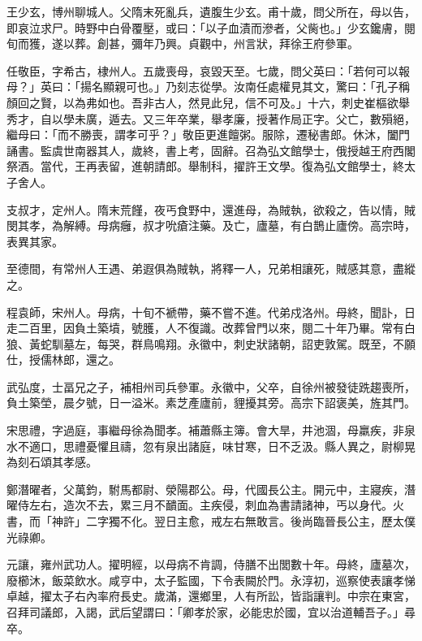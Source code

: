 \begin{pinyinscope}
 王少玄，博州聊城人。父隋末死亂兵，遺腹生少玄。甫十歲，問父所在，母以告，即哀泣求尸。時野中白骨覆壓，或曰：「以子血漬而滲者，父胔也。」少玄鑱膚，閱旬而獲，遂以葬。創甚，彌年乃興。貞觀中，州言狀，拜徐王府參軍。



 任敬臣，字希古，棣州人。五歲喪母，哀毀天至。七歲，問父英曰：「若何可以報母？」英曰：「揚名顯親可也。」乃刻志從學。汝南任處權見其文，驚曰：「孔子稱顏回之賢，以為弗如也。吾非古人，然見此兒，信不可及。」十六，刺史崔樞欲舉秀才，自以學未廣，遁去。又三年卒業，舉孝廉，授著作局正字。父亡，數殞絕，繼母曰：「而不勝喪，謂孝可乎？」敬臣更進饘粥。服除，遷秘書郎。休沐，闔門誦書。監虞世南器其人，歲終，書上考，固辭。召為弘文館學士，俄授越王府西閣祭酒。當代，王再表留，進朝請郎。舉制科，擢許王文學。復為弘文館學士，終太子舍人。



 支叔才，定州人。隋末荒饉，夜丐食野中，還進母，為賊執，欲殺之，告以情，賊閔其孝，為解縛。母病癰，叔才吮瘡注藥。及亡，廬墓，有白鵲止廬傍。高宗時，表異其家。



 至德間，有常州人王遇、弟遐俱為賊執，將釋一人，兄弟相讓死，賊感其意，盡縱之。



 程袁師，宋州人。母病，十旬不褫帶，藥不嘗不進。代弟戍洛州。母終，聞訃，日走二百里，因負土築墳，號臒，人不復識。改葬曾門以來，閱二十年乃畢。常有白狼、黃蛇馴墓左，每哭，群鳥鳴翔。永徽中，刺史狀諸朝，詔吏敦駕。既至，不願仕，授儒林郎，還之。



 武弘度，士畐兄之子，補相州司兵參軍。永徽中，父卒，自徐州被發徒跣趨喪所，負土築塋，晨夕號，日一溢米。素芝產廬前，貍擾其旁。高宗下詔褒美，旌其門。



 宋思禮，字過庭，事繼母徐為聞孝。補蕭縣主簿。會大旱，井池涸，母羸疾，非泉水不適口，思禮憂懼且禱，忽有泉出諸庭，味甘寒，日不乏汲。縣人異之，尉柳晃為刻石頌其孝感。



 鄭潛曜者，父萬鈞，駙馬都尉、滎陽郡公。母，代國長公主。開元中，主寢疾，潛曜侍左右，造次不去，累三月不靧面。主疾侵，刺血為書請諸神，丐以身代。火書，而「神許」二字獨不化。翌日主愈，戒左右無敢言。後尚臨晉長公主，歷太僕光祿卿。



 元讓，雍州武功人。擢明經，以母病不肯調，侍膳不出閭數十年。母終，廬墓次，廢櫛沐，飯菜飲水。咸亨中，太子監國，下令表闕於門。永淳初，巡察使表讓孝悌卓越，擢太子右內率府長史。歲滿，還鄉里，人有所訟，皆詣讓判。中宗在東宮，召拜司議郎，入謁，武后望謂曰：「卿孝於家，必能忠於國，宜以治道輔吾子。」尋卒。




\end{pinyinscope}
